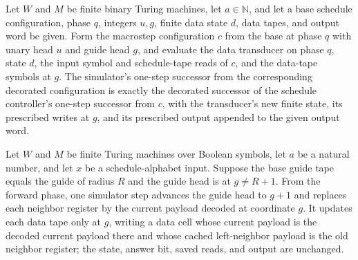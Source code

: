 \begin{lemma}
\label{Complexity.dataCfg_step}
\leanok
{}
Let $W$ and $M$ be finite binary Turing machines, let $a\in\mathbb{N}$, and let a base
schedule configuration, phase $q$, integers $u,g$, finite data state $d$, data tapes,
and output word be given. Form the macrostep configuration $c$ from the base at phase
$q$ with unary head $u$ and guide head $g$, and evaluate the data transducer on phase
$q$, state $d$, the input symbol and schedule-tape reads of $c$, and the data-tape
symbols at $g$. The simulator's one-step successor from the corresponding decorated
configuration is exactly the decorated successor of the schedule controller's one-step
successor from $c$, with the transducer's new finite state, its prescribed writes at
$g$, and its prescribed output appended to the given output word.
\end{lemma}

\begin{lemma}
\label{Complexity.dataCfg_forward_step}
\leanok
{}
Let $W$ and $M$ be finite Turing machines over Boolean symbols, let $a$ be a natural
number, and let $x$ be a schedule-alphabet input. Suppose the base guide tape equals the
guide of radius $R$ and the guide head is at $g\ne R+1$. From the forward phase, one
simulator step advances the guide head to $g+1$ and replaces each neighbor register by
the current payload decoded at coordinate $g$. It updates each data tape only at $g$,
writing a data cell whose current payload is the decoded current payload there and whose
cached left-neighbor payload is the old neighbor register; the state, answer bit, saved
reads, and output are unchanged.
\end{lemma}

